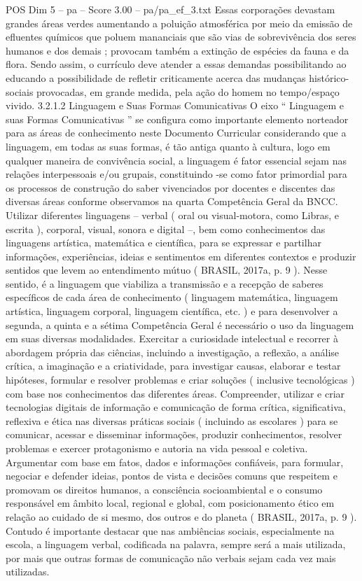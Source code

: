 \begin{textsample}{POS Dim 5 – pa – Score 3.00 – pa/pa\_ef\_3.txt}
Essas corporações devastam grandes áreas verdes aumentando a poluição atmosférica por meio da emissão de efluentes químicos que poluem mananciais que são vias de sobrevivência dos seres humanos e dos demais ; provocam também a extinção de espécies da fauna e da flora.
Sendo assim, o currículo deve atender a essas demandas possibilitando ao educando a possibilidade de refletir criticamente acerca das mudanças histórico-sociais provocadas, em grande medida, pela ação do homem no tempo/espaço vivido. 3.2.1.2 Linguagem e Suas Formas Comunicativas O eixo “ Linguagem e suas Formas Comunicativas ” se configura como importante elemento norteador para as áreas de conhecimento neste Documento Curricular considerando que a linguagem, em todas as suas formas, é tão antiga quanto à cultura, logo em qualquer maneira de convivência social, a linguagem é fator essencial sejam nas relações interpessoais e/ou grupais, constituindo -se como fator primordial para os processos de construção do saber vivenciados por docentes e discentes das diversas áreas conforme observamos na quarta Competência Geral da BNCC.
Utilizar diferentes linguagens – verbal ( oral ou visual-motora, como Libras, e escrita ), corporal, visual, sonora e digital –, bem como conhecimentos das linguagens artística, matemática e científica, para se expressar e partilhar informações, experiências, ideias e sentimentos em diferentes contextos e produzir sentidos que levem ao entendimento mútuo ( BRASIL, 2017a, p. 9 ).
Nesse sentido, é a linguagem que viabiliza a transmissão e a recepção de saberes específicos de cada área de conhecimento ( linguagem matemática, linguagem artística, linguagem corporal, linguagem científica, etc. ) e para desenvolver a segunda, a quinta e a sétima Competência Geral é necessário o uso da linguagem em suas diversas modalidades.
Exercitar a curiosidade intelectual e recorrer à abordagem própria das ciências, incluindo a investigação, a reflexão, a análise crítica, a imaginação e a criatividade, para investigar causas, elaborar e testar hipóteses, formular e resolver problemas e criar soluções ( inclusive tecnológicas ) com base nos conhecimentos das diferentes áreas.
Compreender, utilizar e criar tecnologias digitais de informação e comunicação de forma crítica, significativa, reflexiva e ética nas diversas práticas sociais ( incluindo as escolares ) para se comunicar, acessar e disseminar informações, produzir conhecimentos, resolver problemas e exercer protagonismo e autoria na vida pessoal e coletiva.
Argumentar com base em fatos, dados e informações confiáveis, para formular, negociar e defender ideias, pontos de vista e decisões comuns que respeitem e promovam os direitos humanos, a consciência socioambiental e o consumo responsável em âmbito local, regional e global, com posicionamento ético em relação ao cuidado de si mesmo, dos outros e do planeta ( BRASIL, 2017a, p. 9 ).
Contudo é importante destacar que nas ambiências sociais, especialmente na escola, a linguagem verbal, codificada na palavra, sempre será a mais utilizada, por mais que outras formas de comunicação não verbais sejam cada vez mais utilizadas.

\end{textsample}
